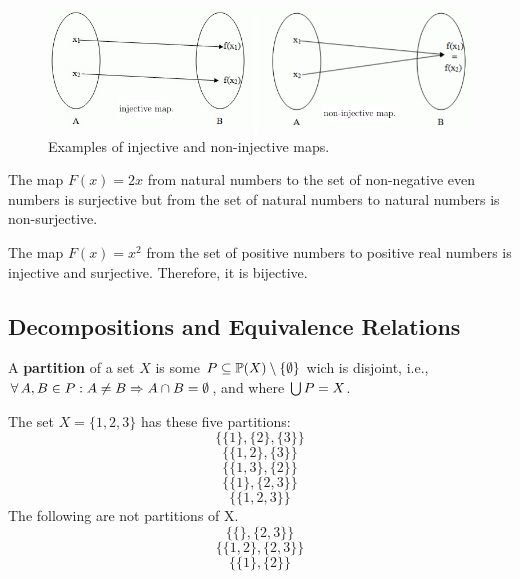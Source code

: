\documentclass[12pt]{book}
\begin{document}
\begin{figure}
      \begin{center}
      \includegraphics[scale =0.8]{p11.png}
      \caption{Examples of injective and non-injective maps.}
	  \label{fig:injct}
\end{center}
	
\end{figure}
\begin{examp}\label{exp:Specialmaps}
      The map $F(x) = 2 x $ from natural numbers to the set of non-negative even numbers is surjective but from the set of natural numbers 
	  to natural numbers is non-surjective.
\end{examp}
\begin{examp}\label{exp:Specialmaps}
      The map $F(x) = x^2$ from the set of positive numbers to positive real numbers is injective and surjective. Therefore, it is bijective.
\end{examp}
\subsection{Decompositions and Equivalence Relations}
\label{sec:Decompositions}

\begin{defi}\label{def:Decompositions}
      A \textbf{partition} of a set $X$ is some $P \subseteq \operatorname{\mathbb{P}}(X) \setminus \{ \emptyset \}$ wich is disjoint, i.e., $\forall\, A, B \in P : A \ne B \Rightarrow A \cap B = \emptyset$, 
	  and where $\bigcup P = X$.
\end{defi}
\begin{examp}\label{exp:Decompositions}
      The set $X = \{ 1, 2, 3 \} $ has these five partitions:
      $$ \{ \{1\}, \{2\}, \{3\}\}$$
      $$ \{ \{1,2\}, \{3\}\}$$
      $$ \{ \{1, 3\}, \{2\}\}$$
      $$ \{ \{1\}, \{2, 3\}\}$$
      $$ \{ \{ 1, 2, 3 \}\}$$
      The following are not partitions of X.
      $$ \{ \{\}, \{2, 3\}\}$$
      $$ \{ \{1, 2\}, \{2, 3\}\}$$
      $$ \{ \{1\}, \{2\}\}$$
\end{examp}
\end{document}

